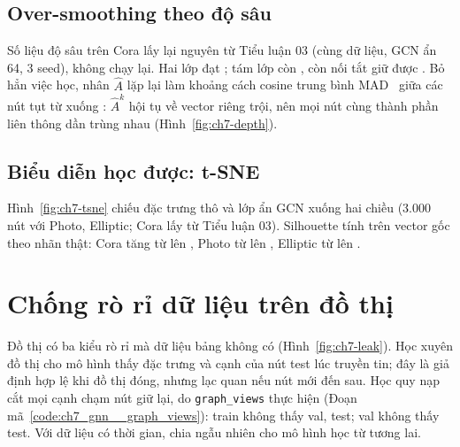 \subsection{Over-smoothing theo độ sâu}

Số liệu độ sâu trên Cora lấy lại nguyên từ Tiểu luận 03 (cùng dữ liệu, GCN ẩn 64, 3 seed), không chạy lại. Hai lớp đạt
; tám lớp còn , còn nối tắt giữ được . Bỏ hẳn việc học, nhân
$\hat A$ lặp lại làm khoảng cách cosine trung bình MAD~\cite{ch7:chen2020} giữa các nút tụt từ  xuống
: $\hat A^k$ hội tụ về vector riêng trội, nên mọi nút cùng thành phần liên thông dần trùng nhau
(Hình~\ref{fig:ch7-depth}).


\subsection{Biểu diễn học được: t-SNE}

Hình~\ref{fig:ch7-tsne} chiếu đặc trưng thô và lớp ẩn GCN xuống hai chiều (3.000 nút với Photo, Elliptic; Cora lấy từ Tiểu luận 03).
Silhouette tính trên vector gốc theo nhãn thật: Cora tăng từ  lên , Photo
từ  lên , Elliptic từ  lên
.


\section{Chống rò rỉ dữ liệu trên đồ thị}

Đồ thị có ba kiểu rò rỉ mà dữ liệu bảng không có (Hình~\ref{fig:ch7-leak}). Học xuyên đồ thị cho mô hình thấy đặc trưng và cạnh của
nút test lúc truyền tin; đây là giả định hợp lệ khi đồ thị đóng, nhưng lạc quan nếu nút mới đến sau. Học quy nạp cắt mọi cạnh chạm
nút giữ lại, do \texttt{graph\_views} thực hiện (Đoạn mã~\ref{code:ch7_gnn__graph_views}): train không thấy val, test; val không thấy test.
Với dữ liệu có thời gian, chia ngẫu nhiên cho mô hình học từ tương lai.


